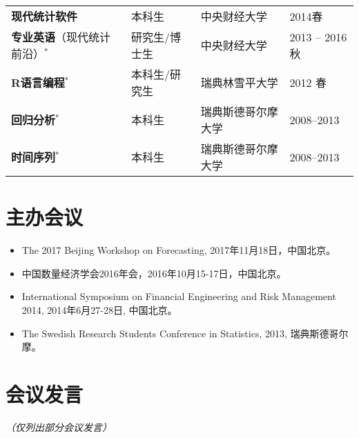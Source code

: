\documentclass[twoside,a4paper,10.5pt]{article}
\begin{document}
\begin{tabular}{l l ll}
  \textbf{现代统计软件}                     & 本科生        & 中央财经大学                   & 2014春           \\
  \textbf{专业英语}（现代统计前沿）$^*$     & 研究生/博士生 & 中央财经大学                   & 2013 -- 2016秋   \\
  \textbf{R语言编程}$^*$                    & 本科生/研究生 & 瑞典林雪平大学                 & 2012 春          \\
  \textbf{回归分析}$^*$                     & 本科生        & 瑞典斯德哥尔摩大学             & 2008--2013       \\
  \textbf{时间序列}$^*$                     & 本科生        & 瑞典斯德哥尔摩大学             & 2008--2013       \\
\bottomrule
\end{tabular}

\section*{主办会议}

\begin{itemize}


\item  The 2017 Beijing Workshop on Forecasting, 2017年11月18日，中国北京。
\item 中国数量经济学会2016年会，2016年10月15-17日，中国北京。

\item International Symposium on Financial Engineering and Risk Management 2014,
  2014年6月27-28日, 中国北京。

\item The Swedish Research Students Conference in Statistics, 2013, 瑞典斯德哥尔摩。
\end{itemize}

\section*{会议发言}

\emph{（仅列出部分会议发言）}
\end{document}

